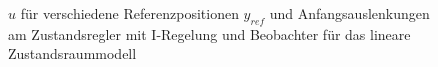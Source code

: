 \begin{figure}[H]
    \centering
    \caption[$u$ für Regler mit I-Regelung und Beobachter (linear)]{$u$ für verschiedene Referenzpositionen $y_{ref}$ und Anfangsauslenkungen am Zustandsregler mit I-Regelung und Beobachter für das lineare Zustandsraummodell}
    \label{fig:Bild55}
\end{figure}